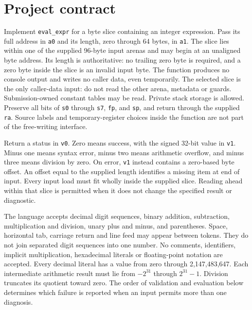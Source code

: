 \section*{Project contract}
Implement \texttt{eval\_expr} for a byte slice containing an integer expression.
Pass its full address in \texttt{a0} and its length, zero through 64 bytes, in
\texttt{a1}. The slice lies within one of the supplied 96-byte input arenas and
may begin at an unaligned byte address. Its length is authoritative: no trailing
zero byte is required, and a zero byte inside the slice is an invalid input byte.
The function produces no console output and writes no caller data, even temporarily.
The selected slice is the only caller-data input: do not read the other arena, metadata or guards. Submission-owned constant tables may be read. Private stack storage is allowed. Preserve all bits of \texttt{s0} through
\texttt{s7}, \texttt{fp}, and \texttt{sp}, and return through the supplied
\texttt{ra}. Source labels and temporary-register choices inside the function are
not part of the free-writing interface.

Return a status in \texttt{v0}. Zero means success, with the signed 32-bit value
in \texttt{v1}. Minus one means syntax error, minus two means arithmetic overflow,
and minus three means division by zero. On error, \texttt{v1} instead contains
a zero-based byte offset. An offset equal to the supplied length identifies a
missing item at end of input. Every input load must fit wholly inside the supplied
slice. Reading ahead within that slice is permitted when it does not change the
specified result or diagnostic.

The language accepts decimal digit sequences, binary addition, subtraction,
multiplication and division, unary plus and minus, and parentheses. Space, horizontal
tab, carriage return and line feed may appear between tokens. They do not join
separated digit sequences into one number. No comments, identifiers, implicit
multiplication, hexadecimal literals or floating-point notation are accepted.
Every decimal literal has a value from zero through 2,147,483,647. Each intermediate
arithmetic result must lie from $-2^{31}$ through $2^{31}-1$. Division truncates its
quotient toward zero. The order of validation and evaluation below determines which
failure is reported when an input permits more than one diagnosis.
